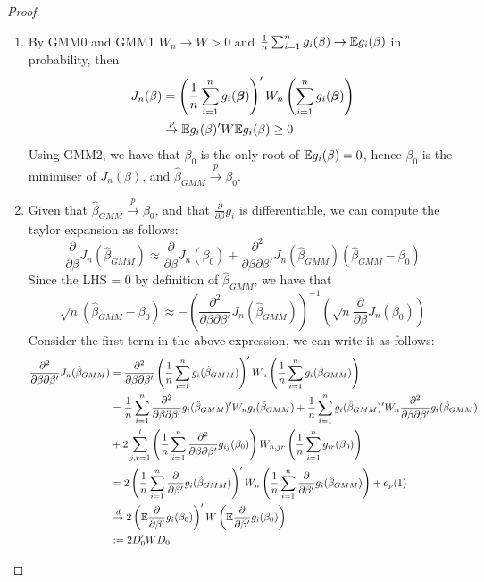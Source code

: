 \documentclass[DIV=14,titlepage=false]{scrreprt}
\begin{document}
\begin{proof}
    \begin{enumerate}
        \item By GMM0 and GMM1 $W_n \to W>0$ and $\frac{1}{n}\sum_{i=1}^{n} g_i(\beta) \to \mathbb{E} g_i(\beta)$ in probability, then 
        \begin{align*}
            J_n(\beta) &= \left(\frac{1}{n}\sum_{i=1}^{n}g_i(\boldsymbol{\beta})\right)' W_n \left(\sum_{i=1}^{n}g_i(\boldsymbol{\beta})\right)\\
            &\overset{p}{\to} \mathbb{E} g_i(\beta)'W\mathbb{E} g_i(\beta) \geq 0
        \end{align*}
        Using GMM2, we have that $\beta_0$ is the only root of $\mathbb{E} g_i(\beta)=0$, hence $\beta_0$ is the minimiser of $J_n(\beta)$, and $\hat\beta_{GMM} \overset{p}{\to} \beta_0$.

        \item Given that $\hat \beta_{GMM} \overset{p}{\to} \beta_0$, and that $\frac{\partial}{\partial \beta}g_i$ is differentiable, we can compute the taylor expansion as follows:
        \[
        \frac{\partial}{\partial \beta}J_n(\hat\beta_{GMM}) \approx \frac{\partial}{\partial \beta}J_n(\beta_0) + \frac{\partial^2}{\partial \beta \partial \beta'}J_n(\hat\beta_{GMM})(\hat\beta_{GMM}-\beta_0)
        \]
        Since the LHS = 0 by definition of $\hat\beta_{GMM}$, we have that
        \[
            \sqrt{n}(\hat\beta_{GMM}-\beta_0) \approx -\left(\frac{\partial^2}{\partial \beta \partial \beta'}J_n(\hat\beta_{GMM})\right)^{-1}\left(\sqrt{n}\frac{\partial}{\partial \beta}J_n(\beta_0)\right)
        \]
        Consider the first term in the above expression, we can write it as follows:
        \begin{align*}
            \frac{\partial^2}{\partial \beta \partial \beta'}J_n(\hat\beta_{GMM}) &= \frac{\partial^2}{\partial \beta \partial \beta'}\left(\frac{1}{n}\sum_{i=1}^{n}g_i(\hat\beta_{GMM})\right)' W_n \left(\frac{1}{n}\sum_{i=1}^{n}g_i(\hat\beta_{GMM})\right)\\
            &= \frac{1}{n}\sum_{i=1}^{n}\frac{\partial^2}{\partial \beta \partial \beta'}g_i(\hat\beta_{GMM})' W_n g_i(\hat\beta_{GMM}) + \frac{1}{n}\sum_{i=1}^{n}g_i(\hat\beta_{GMM})' W_n \frac{\partial^2}{\partial \beta \partial \beta'}g_i(\hat\beta_{GMM})\\
            &+2\sum_{j,r=1}^{l}\left(\frac{1}{n} \sum_{i=1}^{n} \frac{\partial^2}{\partial \beta \partial \beta'}g_{ij}(\beta_0)\right)W_{n,jr}\left(\frac{1}{n}\sum_{i=1}^{n} g_{ir}(\beta_0)\right)\\
            &= 2\left( \frac{1}{n}\sum_{i=1}^{n} \frac{\partial}{\partial \beta'}g_i(\hat\beta_{GMM})\right)' W_n \left( \frac{1}{n}\sum_{i=1}^{n} \frac{\partial}{\partial \beta'}g_i(\hat\beta_{GMM})\right) + o_p(1)\\
            &\overset{d}{\to} 2\left(\mathbb{E} \frac{\partial}{\partial \beta'}g_i(\beta_0)\right)' W \left(\mathbb{E} \frac{\partial}{\partial \beta'}g_i(\beta_0)\right)\\
            &:=2D_0'WD_0
        \end{align*}


\end{enumerate}
\end{proof}
\end{document}
